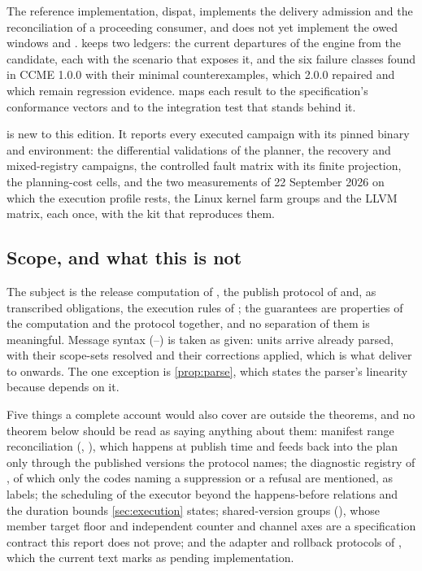 The reference implementation, dispat, implements the delivery admission and
the reconciliation of a proceeding consumer, and does not yet implement the
owed windows and .  keeps two ledgers: the
current departures of the engine from the candidate, each with the scenario
that exposes it, and the six failure classes found in CCME 1.0.0 with their
minimal counterexamples, which 2.0.0 repaired and which remain regression
evidence.  maps each result to the specification's
conformance vectors and to the integration test that stands behind it.

 is new to this edition. It reports every executed
campaign with its pinned binary and environment: the differential validations
of the planner, the recovery and mixed-registry campaigns, the controlled fault
matrix with its finite projection, the planning-cost cells, and the two
measurements of 22 September 2026 on which the execution profile rests, the
Linux kernel farm groups and the LLVM matrix, each once, with the kit that
reproduces them.

\subsection{Scope, and what this is not}

The subject is the release computation of , the publish protocol of
 and, as transcribed obligations, the execution rules of
; the guarantees are properties of the computation and the
protocol together, and no separation of them is meaningful. Message syntax
(--) is taken as given: units arrive already parsed, with their
scope-sets resolved and their corrections applied, which is what
 deliver to  onwards. The one exception is
\cref{prop:parse}, which states the parser's linearity because 
depends on it.

Five things a complete account would also cover are outside the theorems, and
no theorem below should be read as saying anything about them: manifest range
reconciliation (, ), which happens at publish time and
feeds back into the plan only through the published versions the protocol
names; the diagnostic registry of , of which only the codes naming a
suppression or a refusal are mentioned, as labels; the scheduling of the
executor beyond the happens-before relations and the duration bounds
\cref{sec:execution} states; shared-version groups (), whose
member target floor and independent counter and channel axes are a
specification contract this report does not prove; and the adapter and
rollback protocols of , which the current text marks as pending
implementation.

